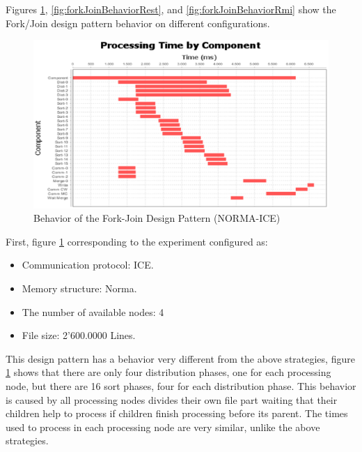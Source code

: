 Figures \ref{fig:forkJoinBehaviorIce}, \ref{fig:forkJoinBehaviorRest}, and \ref{fig:forkJoinBehaviorRmi} show the Fork/Join design pattern behavior on different configurations. 

\begin{figure}[H]
	\centering
	\includegraphics[trim=0.5cm 17cm -5cm 1cm, scale=0.9]{fig/FJDNormaIce426Behavior.eps}
	\caption{Behavior of the Fork-Join Design Pattern (NORMA-ICE)}
	\label{fig:forkJoinBehaviorIce}
\end{figure}

First, figure \ref{fig:forkJoinBehaviorIce} corresponding to the experiment configured as: 
\begin{itemize}
	\item Communication protocol: ICE.
	\item  Memory structure: Norma.
	\item The number of available nodes: 4
	\item File size: 2'600.0000 Lines.
\end{itemize}

This design pattern has a behavior very different from the above strategies, figure \ref{fig:forkJoinBehaviorIce} shows that there are only four distribution phases, one for each processing node, but there are 16 sort phases, four for each distribution phase. This behavior is caused by all processing nodes divides their own file part waiting that their children help to process if children finish processing before its parent. The times used to process in each processing node are very similar, unlike the above strategies.

